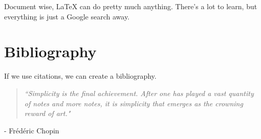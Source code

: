 \documentclass{article}[12pt]
\begin{document}
        Document wise, \LaTeX{} can do pretty much anything. There's a lot to learn, but everything is just a Google search away.
        
    
    \section{Bibliography}
        
        If we use citations, we can create a bibliography. \cite{doe22}
        
        \begin{quote}
            \emph{``Simplicity is the final achievement. After one has played a vast quantity of notes and more notes, it is simplicity that emerges as the crowning reward of art."}
        \end{quote}
        \hfill - Frédéric Chopin \cite{chopin}


        
        
        
\end{document}
